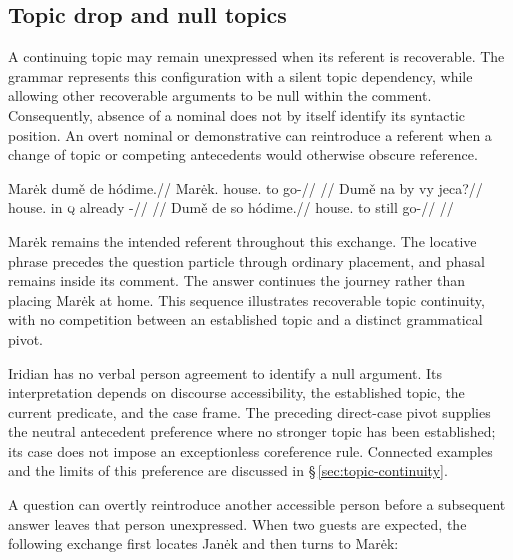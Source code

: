 \subsection{Topic drop and null topics}\label{sec:tc-topic-drop}

A continuing topic may remain unexpressed when its referent is recoverable.
 The grammar represents this configuration with a silent topic dependency,
 while allowing other recoverable arguments to be null within the comment.
 Consequently, absence of a nominal does not by itself identify its syntactic
 position. An overt nominal or demonstrative can reintroduce a referent when
 a change of topic or competing antecedents would otherwise obscure reference.

\pex\label{ex:tc-topdrop}
\a\label{ex:tc-topdrop-overt}%
\begingl
\gla Marėk dumě de hódime.//
\glb Marėk.\Dir{} house.\Ind{} to go-\Prog{}//
\glft {} //
\endgl
\a\label{ex:tc-topdrop-null1}%
\begingl
\gla Dumě na by vy jeca?//
\glb house.\Ind{} in \textsc{q} already \Exst{}-\Cont{}//
\glft {}
      //
\endgl
\a\label{ex:tc-topdrop-null2}%
\begingl
\gla Dumě de so hódime.//
\glb house.\Ind{} to still go-\Prog{}//
\glft {}
      //
\endgl
\xe

\noindent Marėk remains the intended referent throughout this exchange.
 The locative phrase precedes the question particle through ordinary
 placement, and phasal  remains inside its comment. The answer continues the journey rather than placing
 Marėk at home. This sequence illustrates recoverable topic continuity, with
 no competition between an established topic and a distinct grammatical pivot.

Iridian has no verbal person agreement to identify a null argument. Its
 interpretation depends on discourse accessibility, the established topic,
 the current predicate, and the case frame. The preceding direct-case pivot
 supplies the neutral antecedent preference where no stronger topic has been
 established; its case does not impose an exceptionless coreference rule.
 Connected examples and the limits of this preference are discussed in
 §\,\ref{sec:topic-continuity}.

A question can overtly reintroduce another accessible person before a
subsequent answer leaves that person unexpressed. When two guests are
expected, the following exchange first locates Janėk and then turns to
Marėk:

